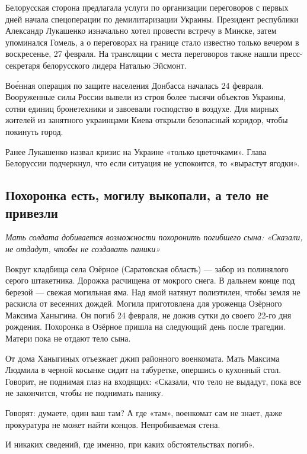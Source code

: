 Белорусская сторона предлагала услуги по организации переговоров с первых дней начала спецоперации по демилитаризации Украины. Президент республики Александр Лукашенко изначально хотел провести встречу в Минске, затем упоминался Гомель, а о переговорах на границе стало известно только вечером в воскресенье, 27 февраля. На трансляции с места переговоров также нашли пресс-секретаря белорусского лидера Наталью Эйсмонт.

Во\'{е}нная операция по защите населения Донбасса началась 24 февраля. Вооруженные силы России вывели из строя более тысячи объектов Украины, сотни единиц бронетехники и завоевали господство в воздухе. Для мирных жителей из занятного украинцами Киева открыли безопасный коридор, чтобы покинуть город.

Ранее Лукашенко назвал кризис на Украине «только цветочками». Глава Белоруссии подчеркнул, что если ситуация не успокоится, то «вырастут ягодки».


\subsection{Похоронка есть, могилу выкопали, а тело не привезли}
\textit{Мать солдата добивается возможности похоронить погибшего сына: «Сказали, не отдадут, чтобы не создавать паники»}

Вокруг кладбища села Озёрное (Саратовская область) --- забор из полинялого серого штакетника. Дорожка расчищена от мокрого снега. В дальнем конце под березой --- свежая могильная яма. Над ямой натянут полиэтилен, чтобы земля не раскисла от весенних дождей. Могила приготовлена для уроженца Озёрного Максима Ханыгина. Он погиб 24 февраля, не дожив сутки до своего 22-го дня рождения. Похоронка в Озёрное пришла на следующий день после трагедии. Матери пока не отдают тело сына.

От дома Ханыгиных отъезжает джип районного военкомата. Мать Максима Людмила в черной косынке сидит на табуретке, опершись о кухонный стол. Говорит, не поднимая глаз на входящих: «Сказали, что тело не выдадут, пока все не закончится, чтобы не поднимать панику.

\begin{fancyquotes}
    Говорят: думаете, один ваш там? А где «там», военкомат сам не знает, даже прокуратура не может найти концов. Непробиваемая стена.
\end{fancyquotes}

И никаких сведений, где именно, при каких обстоятельствах погиб».

